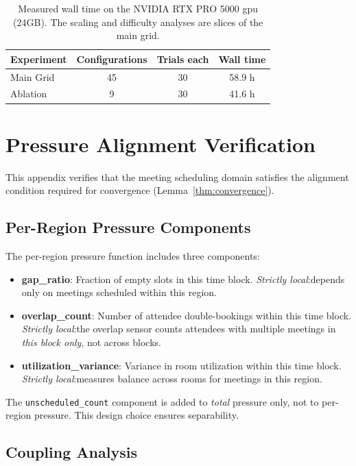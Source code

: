 \begin{table}[htbp]
\centering
\small
\begin{tabular}{@{}lccc@{}}
\toprule
\textbf{Experiment} & \textbf{Configurations} & \textbf{Trials each} & \textbf{Wall time} \\
\midrule
Main Grid & 45 & 30 & 58.9 h \\
Ablation & 9 & 30 & 41.6 h \\
\bottomrule
\end{tabular}
\caption{Measured wall time on the NVIDIA RTX PRO 5000 \acs{gpu} (24GB). The scaling and difficulty analyses are slices of the main grid.}
\label{tab:runtime}
\end{table}


\section{Pressure Alignment Verification}
\label{app:coupling}

This appendix verifies that the meeting scheduling domain satisfies the alignment condition required for convergence (Lemma~\ref{thm:convergence}).

\subsection{Per-Region Pressure Components}

The per-region pressure function includes three components:
\begin{itemize}
\item \textbf{gap\_ratio}: Fraction of empty slots in this time block. \emph{Strictly local}:depends only on meetings scheduled within this region.
\item \textbf{overlap\_count}: Number of attendee double-bookings within this time block. \emph{Strictly local}:the overlap sensor counts attendees with multiple meetings in \emph{this block only}, not across blocks.
\item \textbf{utilization\_variance}: Variance in room utilization within this time block. \emph{Strictly local}:measures balance across rooms for meetings in this region.
\end{itemize}

The \texttt{unscheduled\_count} component is added to \emph{total} pressure only, not to per-region pressure. This design choice ensures separability.

\subsection{Coupling Analysis}

